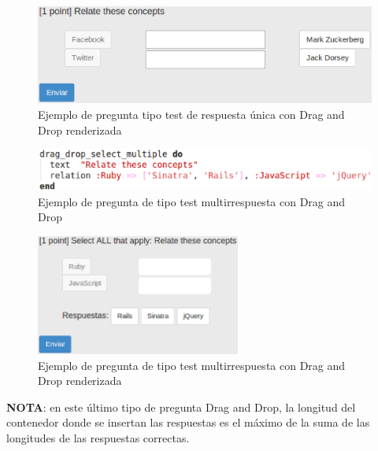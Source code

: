 \begin{itemize}
\begin{itemize}
    \begin{figure}[!th]
    \begin{center}
    \includegraphics[width=1\textwidth]{images/dd2r.eps}
    \caption{Ejemplo de pregunta tipo test de respuesta \'unica con Drag and Drop renderizada}
    \label{fig:dd2r}
    \end{center}
    \end{figure}
    \newpage
    
    \begin{figure}[!th]
    \begin{center}
    \includegraphics[width=1\textwidth]{images/dd3.eps}
    \caption{Ejemplo de pregunta de tipo test multirrespuesta con Drag and Drop}
    \label{fig:dd3}
    \end{center}
    \end{figure}
   
    \begin{figure}[!th]
    \begin{center}
    \includegraphics[width=0.6\textwidth]{images/dd3r.eps}
    \caption{Ejemplo de pregunta de tipo test multirrespuesta con Drag and Drop renderizada}
    \label{fig:dd3r}
    \end{center}
    \end{figure}
    
    {\bfseries NOTA}: en este \'ultimo tipo de pregunta Drag and Drop, la longitud del contenedor donde se insertan las 
    respuestas es el m\'aximo de la suma de las longitudes de las respuestas correctas.
    \bigskip
    

\end{itemize}
\end{itemize}
